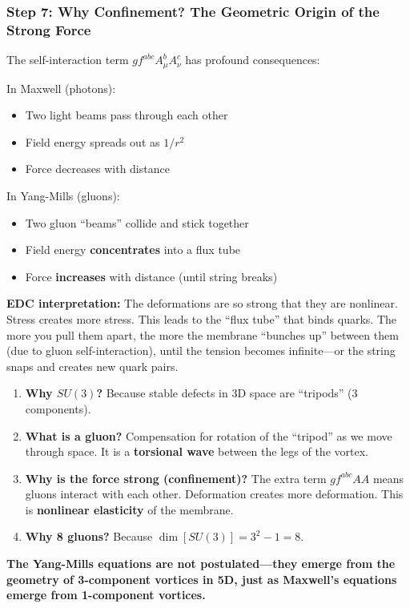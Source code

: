 \subsubsection{Step 7: Why Confinement? The Geometric Origin of the Strong Force}

The self-interaction term $gf^{abc}A_\mu^b A_\nu^c$ has profound consequences:

In Maxwell (photons):
\begin{itemize}
    \item Two light beams pass through each other
    \item Field energy spreads out as $1/r^2$
    \item Force decreases with distance
\end{itemize}

In Yang-Mills (gluons):
\begin{itemize}
    \item Two gluon ``beams'' collide and stick together
    \item Field energy \textbf{concentrates} into a flux tube
    \item Force \textbf{increases} with distance (until string breaks)
\end{itemize}

\textbf{EDC interpretation:} The deformations are so strong that they are nonlinear. Stress creates more stress. This leads to the ``flux tube'' that binds quarks. The more you pull them apart, the more the membrane ``bunches up'' between them (due to gluon self-interaction), until the tension becomes infinite---or the string snaps and creates new quark pairs.

\begin{tcolorbox}[colback=green!5,colframe=green!60!black,title=Summary: QCD from Geometry]
\begin{enumerate}
    \item \textbf{Why $SU(3)$?} Because stable defects in 3D space are ``tripods'' (3 components).
    \item \textbf{What is a gluon?} Compensation for rotation of the ``tripod'' as we move through space. It is a \textbf{torsional wave} between the legs of the vortex.
    \item \textbf{Why is the force strong (confinement)?} The extra term $gf^{abc}AA$ means gluons interact with each other. Deformation creates more deformation. This is \textbf{nonlinear elasticity} of the membrane.
    \item \textbf{Why 8 gluons?} Because $\dim[SU(3)] = 3^2 - 1 = 8$.
\end{enumerate}

\textbf{The Yang-Mills equations are not postulated---they emerge from the geometry of 3-component vortices in 5D, just as Maxwell's equations emerge from 1-component vortices.}
\end{tcolorbox}

